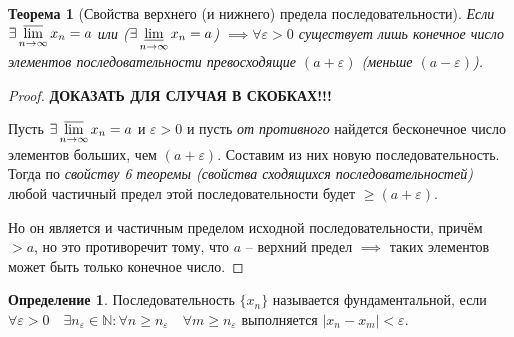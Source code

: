 \documentclass[a4paper,oneside]{article}
\newtheorem{theorem}{Теорема}[subsection]
\theoremstyle{definition}
\newtheorem{definition}{Определение}[subsection]
\theoremstyle{definition}
\theoremstyle{definition}
\begin{document}
\begin{theorem}[Свойства верхнего (и нижнего) предела последовательности]
    Если $\exists \displaystyle\varlimsup_{n \to \infty} x_n = a$ 
    или ($\exists \displaystyle\varliminf_{n \to \infty} x_n = a$)
    $\implies \forall \varepsilon > 0$ существует лишь конечное число элементов
    последовательности превосходящие $(a + \varepsilon)$ (меньше $(a - \varepsilon)$).
\end{theorem}
\begin{proof}
    \textbf{ДОКАЗАТЬ ДЛЯ СЛУЧАЯ В СКОБКАХ!!!}

    Пусть $\exists \displaystyle\varlimsup_{n \to \infty} x_n = a$ и $\varepsilon > 0$ и
    пусть \textit{от противного} найдется бесконечное число элементов больших, чем
    $(a + \varepsilon)$. Составим из них новую последовательность. Тогда по 
    \textit{свойству 6 теоремы (свойства сходящихся последовательностей)} любой
    частичный предел этой последовательности будет $\ge (a + \varepsilon)$.
    
    Но он является и частичным пределом исходной последовательности, причём $> a$, но
    это противоречит тому, что $a$ -- верхний предел $\implies$ таких элементов может
    быть только конечное число.
\end{proof}

\begin{definition}
    Последовательность $\{x_n\}$ называется фундаментальной, если 
    $\forall \varepsilon > 0 \quad \exists n_\varepsilon \in \mathbb{N}:
    \forall n \ge n_\varepsilon \quad \forall m \ge n_\varepsilon$
    выполняется $|x_n - x_m| < \varepsilon$.
\end{definition}
\end{document}
